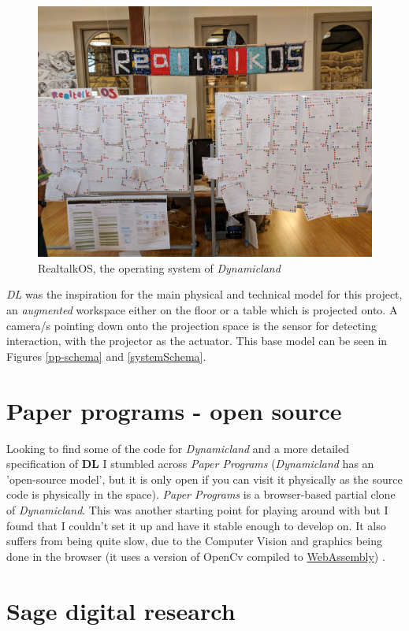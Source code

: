 \documentclass[12pt]{report}
\begin{document}
\begin{figure}[htbp]
\centering
\includegraphics[width=12cm]{assets/realtalk-os.jpg}
\caption{RealtalkOS, the operating system of \emph{Dynamicland}}
\end{figure}  


\emph{DL} was the inspiration for the main physical and technical model for
this project, an \emph{augmented} workspace either on the floor or a table which is
projected onto. A camera/s pointing down onto the projection space is the sensor
for detecting interaction, with the projector as the actuator. This base model can be
seen in Figures \ref{pp-schema} and  \ref{systemSchema}.

\section{Paper programs - open source}
\label{sec:org905e499}

Looking to find some of the code for \emph{Dynamicland} and a more detailed
specification of \textbf{DL} I stumbled across \emph{Paper Programs} (\emph{Dynamicland} has an
'open-source model', but it is only open if you can visit it physically as the
source code is physically in the space). \emph{Paper Programs} is a browser-based
partial clone of \emph{Dynamicland}. This was another starting point for playing
around with but I found that I couldn't set it up and have it stable enough to
develop on. It also suffers from being quite slow, due to the Computer Vision
and graphics being done in the browser (it uses a version of OpenCv compiled to
\href{https://webassembly.org/}{WebAssembly}) \cite{JpPaperPrograms}.


\section{Sage digital research}
\label{sec:orgfa568bc}
\end{document}
